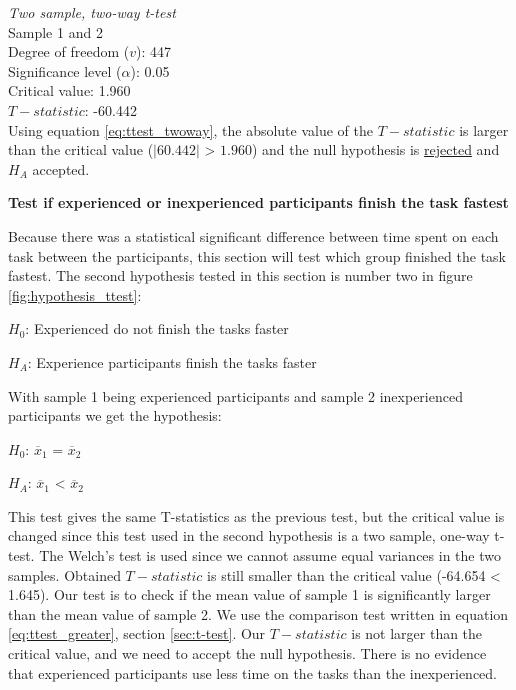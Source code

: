  \begin{center}
	\begin{tcolorbox}[width=0.8\textwidth]
		\centering
		\textit{Two sample, two-way t-test}\\
		Sample 1 and 2\\[0.5cm]
		
		Degree of freedom ($v$): 447 \\ %
		Significance level ($\alpha$): 0.05 \\
		Critical value: 1.960\\[0.2cm]
		$T-statistic$: -60.442 \\
		
		Using equation \ref{eq:ttest_twoway}, the absolute value of the $T-statistic$ is larger than the critical value ($|60.442|$ > $1.960$) and the null hypothesis is \underline{rejected} and $H_A$ accepted.\\[0.5cm]

	\end{tcolorbox} 
\end{center}

\vspace{0.5cm}

\textbf{Test if experienced or inexperienced participants finish the task fastest} 

Because there was a statistical significant difference between time spent on each task between the participants, this section will test which group finished the task fastest. The second hypothesis tested in this section is number two in figure \ref{fig:hypothesis_ttest}:\newline

\centerline{$H_{0}$: Experienced do not finish the tasks faster}
\centerline{$H_{A}$: Experience participants finish the tasks faster}

With sample 1 being experienced participants and sample 2 inexperienced participants we get the hypothesis:\\[0.2cm]

\centerline{$H_{0}$: $\overline{x}_1$ = $\overline{x}_2$}
\centerline{$H_{A}$: $\overline{x}_1$ < $\overline{x}_2$}

This test gives the same T-statistics as the previous test, but the critical value is changed since this test used in the second hypothesis is a two sample, one-way t-test. The Welch's test is used since we cannot assume equal variances in the two samples. Obtained $T-statistic$ is still smaller than the critical value (-64.654 < 1.645). Our test is to check if the mean value of sample 1 is significantly larger than the mean value of sample 2. We use the comparison test written in equation \ref{eq:ttest_greater}, section \ref{sec:t-test}. Our $T-statistic$ is not larger than the critical value, and we need to accept the null hypothesis. There is no evidence that experienced participants use less time on the tasks than the inexperienced. \\[0.2cm]

